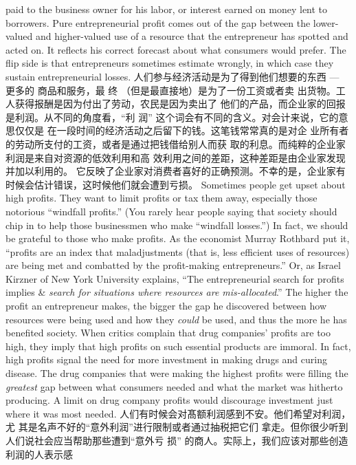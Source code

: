 \begin{paracol}{2}
paid to the business owner for his labor, or interest earned on money lent to borrowers. Pure entrepreneurial profit comes out
of the gap between the lower-valued and higher-valued use of a
resource that the entrepreneur has spotted and acted on. It reflects his correct forecast about what consumers would prefer.
The flip side is that entrepreneurs sometimes estimate wrongly,
in which case they sustain entrepreneurial losses.
\switchcolumn
人们参与经济活动是为了得到他们想要的东西 --- 更多的
商品和服务，最 终 （但是最直接地）是为了一份工资或者卖
出货物。工人获得报酬是因为付出了劳动，农民是因为卖出了
他们的产品，而企业家的回报是利润。从不同的角度看，“利
润” 这个词会有不同的含义。对会计来说，它的意思仅仅是
在一段时间的经济活动之后留下的钱。这笔钱常常真的是对企
业所有者的劳动所支付的工资，或者是通过把钱借给别人而获
取的利息。而纯粹的企业家利润是来自对资源的低效利用和高
效利用之间的差距，这种差距是由企业家发现并加以利用的。
它反映了企业家对消费者喜好的正确预测。不幸的是，企业家有时候会估计错误，这时候他们就会遭到亏损。
\switchcolumn*
Sometimes people get upset about high profits. They want to
limit profits or tax them away, especially those notorious ``windfall profits.'' (You rarely hear people saying that society should
chip in to help those businessmen who make ``windfall losses.'')
In fact, we should be grateful to those who make profits. As the
economist Murray Rothbard put it, ``profits are an index that
maladjustments (that is, less efficient uses of resources) are
being met and combatted by the profit-making entrepreneurs.''
Or, as Israel Kirzner of New York University explains, ``The entrepreneurial search for profits implies \& \textit{search for situations where
resources are mis-allocated}.'' The higher the profit an entrepreneur
makes, the bigger the gap he discovered between how resources
were being used and how they \textit{could} be used, and thus the more
he has benefited society. When critics complain that drug companies' profits are too high, they imply that high profits on such essential products are immoral. In fact, high profits signal the need for more investment in making drugs and curing disease. The drug companies that were making the highest profits were
filling the \textit{greatest} gap between what consumers needed and
what the market was hitherto producing. A limit on drug company profits would discourage investment just where it was most needed.
\switchcolumn
人们有时候会对髙额利润感到不安。他们希望对利润，尤
其是名声不好的“意外利润”进行限制或者通过抽税把它们
拿走。但你很少听到人们说社会应当帮助那些遭到“意外亏
损” 的商人。实际上，我们应该对那些创造利润的人表示感

\end{paracol}
